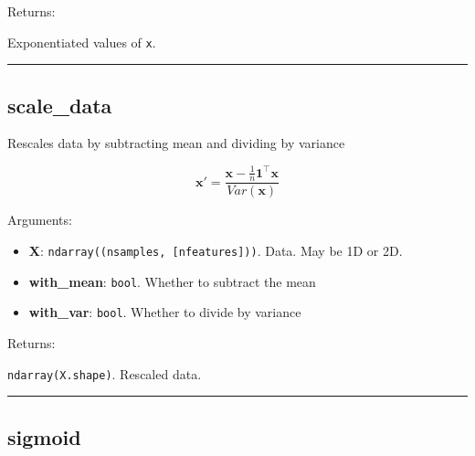 Returns:

Exponentiated values of \texttt{x}.

\begin{center}\rule{0.5\linewidth}{\linethickness}\end{center}

\hypertarget{scale_data}{%
\subsection{scale\_data}\label{scale_data}}

\begin{Shaded}
\begin{Highlighting}[]
\OperatorTok{=}\OperatorTok{=}\OperatorTok{=}\NormalTok{)}
\end{Highlighting}
\end{Shaded}

Rescales data by subtracting mean and dividing by variance

\[
\mathbf x' = \frac{\mathbf x - \frac{1}{n} \mathbf 1^\top \mathbf x}{Var(\mathbf x)}
\]

Arguments:

\begin{itemize}
\tightlist
\item
  \textbf{X}: \texttt{ndarray((nsamples,\ {[}nfeatures{]}))}. Data. May
  be 1D or 2D.
\item
  \textbf{with\_mean}: \texttt{bool}. Whether to subtract the mean
\item
  \textbf{with\_var}: \texttt{bool}. Whether to divide by variance
\end{itemize}

Returns:

\texttt{ndarray(X.shape)}. Rescaled data.

\begin{center}\rule{0.5\linewidth}{\linethickness}\end{center}

\hypertarget{sigmoid}{%
\subsection{sigmoid}\label{sigmoid}}

\begin{Shaded}
\begin{Highlighting}[]
\OperatorTok{=-}\OperatorTok{=}\NormalTok{)}
\end{Highlighting}
\end{Shaded}

